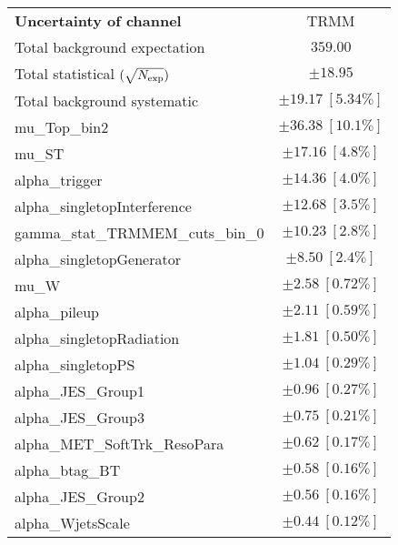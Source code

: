 
\begin{table}
\begin{center}
\setlength{\tabcolsep}{0.0pc}
\begin{tabular*}{\textwidth}{@{\extracolsep{\fill}}lc}
\noalign{\smallskip}\hline\noalign{\smallskip}
{\bf Uncertainty of channel}                                    & TRMM         \\
\noalign{\smallskip}\hline\noalign{\smallskip}
Total background expectation             &  $359.00$       \\
\noalign{\smallskip}\hline\noalign{\smallskip}
Total statistical $(\sqrt{N_{\rm exp}})$              & $\pm 18.95$       \\
Total background systematic               & $\pm 19.17\ [5.34\%] $             \\
\noalign{\smallskip}\hline\noalign{\smallskip}
\noalign{\smallskip}\hline\noalign{\smallskip}
mu\_Top\_bin2         & $\pm 36.38\ [10.1\%] $       \\
mu\_ST         & $\pm 17.16\ [4.8\%] $       \\
alpha\_trigger         & $\pm 14.36\ [4.0\%] $       \\
alpha\_singletopInterference         & $\pm 12.68\ [3.5\%] $       \\
gamma\_stat\_TRMMEM\_cuts\_bin\_0         & $\pm 10.23\ [2.8\%] $       \\
alpha\_singletopGenerator         & $\pm 8.50\ [2.4\%] $       \\
mu\_W         & $\pm 2.58\ [0.72\%] $       \\
alpha\_pileup         & $\pm 2.11\ [0.59\%] $       \\
alpha\_singletopRadiation         & $\pm 1.81\ [0.50\%] $       \\
alpha\_singletopPS         & $\pm 1.04\ [0.29\%] $       \\
alpha\_JES\_Group1         & $\pm 0.96\ [0.27\%] $       \\
alpha\_JES\_Group3         & $\pm 0.75\ [0.21\%] $       \\
alpha\_MET\_SoftTrk\_ResoPara         & $\pm 0.62\ [0.17\%] $       \\
alpha\_btag\_BT         & $\pm 0.58\ [0.16\%] $       \\
alpha\_JES\_Group2         & $\pm 0.56\ [0.16\%] $       \\
alpha\_WjetsScale         & $\pm 0.44\ [0.12\%] $       \\

\end{tabular*}
\end{center}
\end{table}

